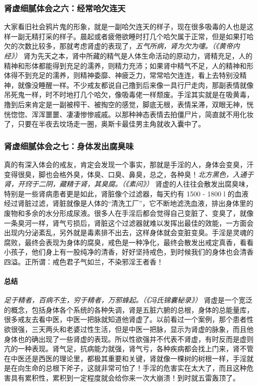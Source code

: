 \subsubsection{肾虚细腻体会之六：经常哈欠连天}

大家看旧社会鸦片鬼的形象，就是一副哈欠连天的样子，现在很多吸毒的人也是这样一副无精打采的样子。晨起或者疲倦欲睡时打几个哈欠属于正常，但是如果打哈欠的次数比较多，那就考虑肾虚的表现了，\textit{五气所病，肾为欠为嚏。（《黄帝内经》）} 肾为先天之本，肾中所藏的精气是人体生命活动的原动力，肾精充足，人的精神和形体都能得到充足的濡养，则精力充沛；如果肾中精气不足，人的精神和形体得不到充足的濡养，则精神委靡、神疲乏力，常常哈欠连连，看上去特别没精神，就像没睡醒一样。不少戒友都说自己撸到后来像一具行尸走肉，那副表情就像吊死鬼一样，时不时地打几个哈欠，像吸毒佬一样颓废。手淫其实就是在吸黄毒，撸到后来肯定是一副被榨干、被掏空的感觉，脚底无根，表情呆滞，双眼无神，恍恍惚惚、浑浑噩噩、凄凄惨惨戚戚。以那种神态表情去拍僵尸片，简直就不用化妆了，只要在半夜去坟场走一圈，奥斯卡最佳男主角就收入囊中了。

\subsubsection{肾虚细腻体会之七：身体发出腐臭味}

真的有深入体会的戒友，肯定会发现一个事实，那就是手淫的人，身体会变臭，汗变得很臭，脚也会格外臭，体臭、口臭、鼻臭，总之，各种臭！\textit{北方黑色，入通于肾，开窍于二阴，藏精于肾，其臭腐。（《素问》）} 肾虚的人往往会散发出腐臭味，特别是一些肾病患者更是如此，肾脏像个过滤器，每天约有 1500 - 1800 \unit{\l} 的血液经过肾脏过滤，肾脏就像是人体的“清洗工厂”，它不断地滤洗血液，排出身体里的废物和多余的水分形成尿液。很多人在手淫后都会觉得自己变脏了、变臭了，就像一条臭河一样，肾气亏损后，肾脏这个过滤器就难以发挥出最佳的效能，一方面会出现内分泌紊乱，另外就是毒素排不出去，这样身体就会变脏变臭。手淫是灵魂的腐败，最终会表现为身体的腐臭，戒色是一种净化，最终会散发出戒定真香，看看小孩子，他们身上有一股纯净的清香，好好坚持戒色，到时候我们的身体也会清香四溢。正所谓：戒色君子气如兰，不染邪淫王者香！

\paragraph*{总结}

\textit{足于精者，百病不生，穷于精者，万邪蜂起。（《冯氏锦囊秘录》）} 肾虚是一个宽泛的概念，包括身体各个系统的各种失调，肾是五脏六腑的总根，身体的总能量库，很多戒友去看中医，中医一把脉就知道他肾虚了。以前看过一个案例，那个患者性欲很强，三天两头和老婆过性生活，但是中医一把脉，显示为肾虚的脉象，而且他身体也的确出现了一些肾虚的表现。所以性欲强并不代表不肾虚，有时反而是虚则亢的一种表现。肾气足，抗病能力就强，肾气亏，各种疾病都会找上门来，肾不管在中医还是西医的理论里，都极其重要和关键，肾就像一棵树的树根一样，手淫就是在向生命的总根下斧子，这就非常可怕了！手淫的危害实在太大了，而且这种危害具有累积性，累积到一定程度就会给你来一次大崩溃！到时就五雷轰顶了。

